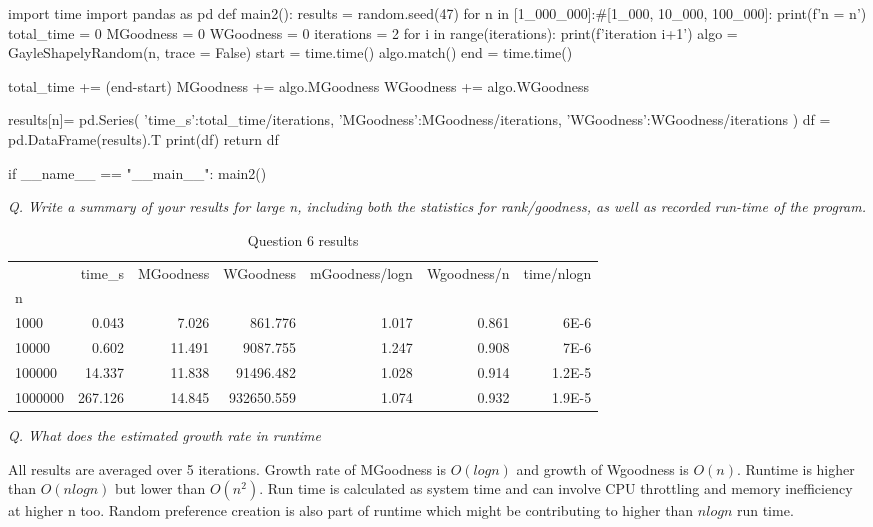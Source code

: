 \documentclass{homeworg}
\begin{document}
\begin{python}
import time
import pandas as pd
def main2():
    results = {}
    random.seed(47)
    for n in [1_000_000]:#[1_000, 10_000, 100_000]:
        print(f'n =  {n}')
        total_time = 0
        MGoodness = 0
        WGoodness = 0
        iterations = 2
        for i in range(iterations):
            print(f'iteration {i+1}')
            algo = GayleShapelyRandom(n, trace = False)
            start = time.time()
            algo.match()
            end = time.time()
            
            total_time += (end-start)
            MGoodness += algo.MGoodness
            WGoodness += algo.WGoodness
        
        results[n]= pd.Series({
                'time_s':total_time/iterations,
                'MGoodness':MGoodness/iterations,
                'WGoodness':WGoodness/iterations
            })
    df =  pd.DataFrame(results).T
    print(df)
    return df

if __name__ == "__main__":
    main2()
\end{python}

\emph{Q. Write a summary of your results for large n, including both the statistics for rank/goodness, as well as recorded run-time of the program.}

\begin{table}[h]
\centering
\caption{Question 6 results}
\label{table:q6}
\small\addtolength{\tabcolsep}{-1pt}
\begin{tabular}{lrrrrrr}
\toprule
{} &      time\_s &  MGoodness &      WGoodness &  mGoodness/logn &  Wgoodness/n &  time/nlogn \\
n       &             &            &                &                 &              &             \\
\midrule
1000    &    0.043 &   7.026 &     861.776 &        1.017 &     0.861 &    6E-6 \\
10000   &    0.602 &  11.491 &    9087.755 &        1.247 &     0.908 &    7E-6 \\
100000  &   14.337 &  11.838 &   91496.482 &        1.028 &     0.914 &    1.2E-5 \\
1000000 &  267.126 &  14.845 &  932650.559 &        1.074 &     0.932 &    1.9E-5 \\
\bottomrule
\end{tabular}
\end{table}

\emph{Q. What does the estimated growth rate in runtime}

All results are averaged over 5 iterations. Growth rate of MGoodness is $O(logn)$ and growth of Wgoodness is $O(n)$. Runtime is higher than  $O(nlogn)$ but lower than $O(n^2)$. Run time is calculated as system time and can involve CPU throttling and memory inefficiency at higher n too. Random preference creation is also part of runtime which might be contributing to higher than $nlogn$ run time. 
\end{document}
